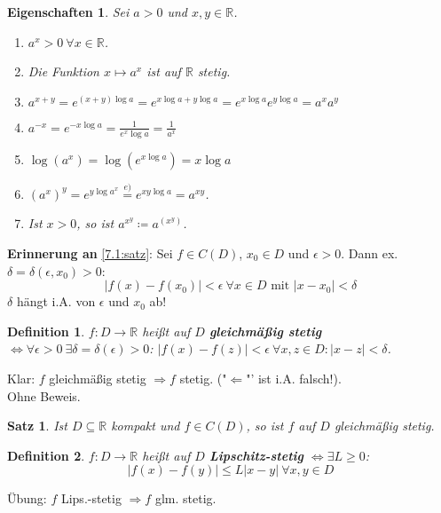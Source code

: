 \documentclass[titlepage,ngerman,a4paper,headsepline]{scrartcl}
\newcommand{\R}{\mathbb{R}}
\theoremstyle{named}
\theoremstyle{dotless}
\newtheorem{satz}[namedtheorem]{Satz}
\newtheorem*{definition}{Definition}
\newtheorem*{eigenschaften}{Eigenschaften}
\begin{document}
\begin{eigenschaften}
	Sei $a > 0$ und $x, y \in \R$.
	\begin{enumerate}
		\item $a^{x} > 0 ~\forall x \in \R$.
		\item Die Funktion $x \mapsto a^{x}$ ist auf $\R$ stetig.
		\item $a^{x+y} = e^{(x+y)\log a} = e^{x\log a + y \log a} = e^{x \log a} e^{y \log a} = a^{x} a^{y}$
		\item $a^{-x} = e^{-x\log a} = \frac{1}{e^{x} \log a} = \frac{1}{a^{x}}$
		\item $\log(a^{x}) = \log ( e^{x \log a}) = x \log a$
		\item $(a^{x})^{y} = e^{y \log a^{x}} \overset{e)}{=} e^{xy \log a} = a^{xy}$.
		\item Ist $x > 0$, so ist $a^{x^{y}} \coloneqq a^{\left(x^{y}\right)}$.
	\end{enumerate}	
\end{eigenschaften}


\textbf{Erinnerung an} \ref{7.1:satz}: Sei $f \in C(D)$, $x_{0} \in D$ und $\epsilon > 0$. Dann ex. $\delta = \delta(\epsilon, x_{0}) > 0$:
	$$ |f(x) - f(x_{0})| < \epsilon ~\forall x \in D \text{ mit } |x - x_{0}| < \delta $$
	$\delta$ hängt i.A. von $\epsilon$ und $x_{0}$ ab!

\begin{definition}
	$f \colon D \rightarrow \R$ hei{\ss}t auf $D$ \textbf{gleichmä{\ss}ig stetig} $\iff \forall \epsilon > 0 ~\exists \delta = \delta(\epsilon) > 0$: $|f(x) - f(z)| < \epsilon ~\forall x, z \in D: |x - z| < \delta$.
\end{definition}

Klar: $f$ gleichmä{\ss}ig stetig $\Rightarrow f$ stetig. ("$\Leftarrow$"' ist i.A. falsch!). \\
Ohne Beweis.

\begin{satz} \label{7.16:satz}
	Ist $D \subseteq \R$ kompakt und $f \in C(D)$, so ist $f$ auf $D$ gleichmä{\ss}ig stetig.
\end{satz}


\begin{definition}
	$f \colon D \rightarrow \R$ hei{\ss}t auf $D$ \textbf{Lipschitz-stetig} $\iff \exists L \geq 0$:
	$$ | f(x) - f(y) | \leq L |x - y| ~\forall x, y \in D  $$
\end{definition}

Übung: $f$ Lips.-stetig $\Rightarrow f$ glm. stetig.
\end{document}
